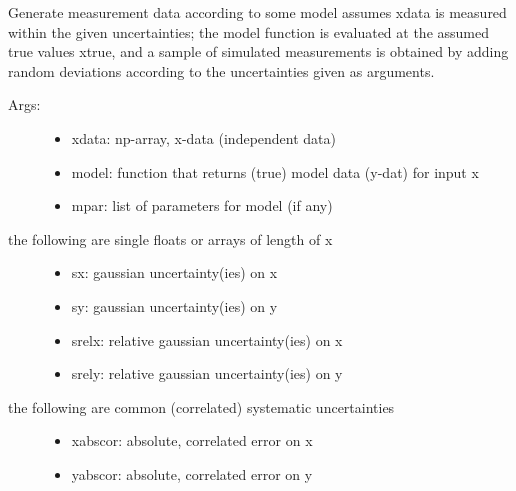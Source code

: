 \documentclass[letterpaper,10pt,english]{sphinxmanual}
\begin{document}
\begin{fulllineitems}
\label{\detokenize{index:PhyPraKit.PhyPraKit.generateXYdata}}
Generate measurement data according to some model
assumes xdata is measured within the given uncertainties; 
the model function is evaluated at the assumed \sphinxquotedblleft{}true\sphinxquotedblright{} values 
xtrue, and a sample of simulated measurements is obtained by 
adding random deviations according to the uncertainties given 
as arguments.
\begin{description}
\item[{Args:}] \leavevmode\begin{itemize}
\item {} 
xdata:  np-array, x-data (independent data)

\item {} 
model: function that returns (true) model data (y-dat) for input x

\item {} 
mpar: list of parameters for model (if any)

\end{itemize}

\item[{the following are single floats or arrays of length of x}] \leavevmode\begin{itemize}
\item {} 
sx: gaussian uncertainty(ies) on x

\item {} 
sy: gaussian uncertainty(ies) on y

\item {} 
srelx: relative gaussian uncertainty(ies) on x

\item {} 
srely: relative gaussian uncertainty(ies) on y

\end{itemize}

\item[{the following are common (correlated) systematic uncertainties}] \leavevmode\begin{itemize}
\item {} 
xabscor: absolute, correlated error on x

\item {} 
yabscor: absolute, correlated error on y


\end{itemize}
\end{description}
\end{fulllineitems}
\end{document}
